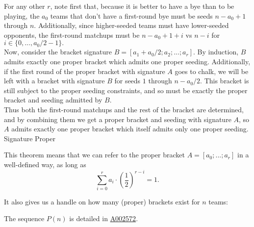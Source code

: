 {{    For any other $r$, note first that, because it is better to have a bye than to be playing, the $a_0$ teams that don't have a first-round bye must be seeds $n - a_0 + 1$ through $n$. Additionally, since higher-seeded teams must have lower-seeded opponents, the first-round matchups must be $n - a_0 + 1 + i$ vs $n - i$ for $i \in \{0, ..., a_0/2 - 1\}.$\\

    Now, consider the bracket signature $B = [a_1 + a_0/2; a_2; ...; a_r].$ By induction, $B$ admits exactly one proper bracket which admits one proper seeding. Additionally, if the first round of the proper bracket with signature $A$ goes to chalk, we will be left with a bracket with signature $B$ for seeds $1$ through $n - a_0/2.$ This bracket is still subject to the proper seeding constraints, and so must be exactly the proper bracket and seeding admitted by $B$.\\

    Thus both the first-round matchups and the rest of the bracket are determined, and by combining them we get a proper bracket and seeding with signature $A$, so $A$ admits exactly one proper bracket which itself admits only one proper seeding.
}{Signature Proper}

This theorem means that we can refer to the proper bracket $A = [a_0; ...; a_r]$ in a well-defined way, as long as $$\sum_{i=0}^r a_i \cdot \left(\frac{1}{2}\right)^{r - i} = 1.$$

It also gives us a handle on how many (proper) brackets exist for $n$ teams:


The sequence $P(n)$ is detailed in \href{https://oeis.org/A002572}{A002572}.

}